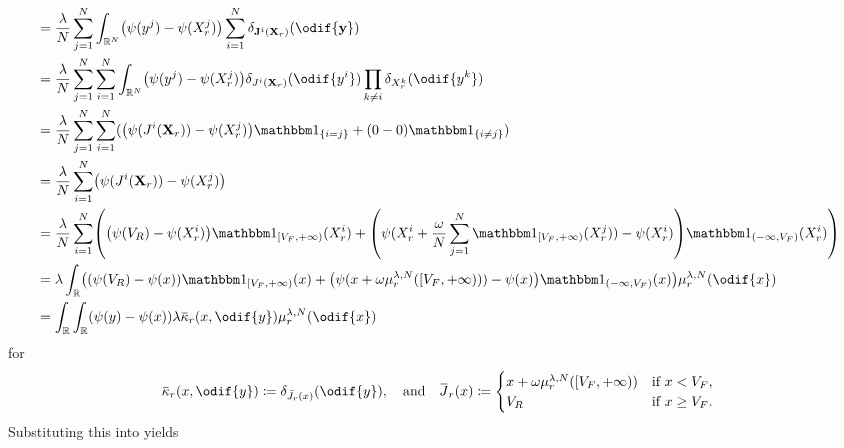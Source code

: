 \begin{equation}
\begin{split}
     & = \frac{\lambda}{N} \sum_{j=1}^N \int_{\potspace^N} \br*{ \psi(y^j) - \psi(X_{r}^j) } \sum_{i=1}^N \delta_{\bm{\jtarg}^i(\bm{X}_r)}(\odif{\bm{y}})                                     \\
     & = \frac{\lambda}{N} \sum_{j=1}^N \sum_{i=1}^N \int_{\potspace^N} \br*{ \psi(y^j) - \psi(X_{r}^j) } \delta_{\jtarg^i(\bm{X}_r)}(\odif{y^i}) \prod_{k \neq i} \delta_{X_r^k}(\odif{y^k}) \\
     & = \frac{\lambda}{N} \sum_{j=1}^N \sum_{i=1}^N \br{ \br*{ \psi(\jtarg^i(\bm{X}_r)) - \psi(X_{r}^j) } \ind{i = j} + (0 - 0) \ind{i \neq j} }                                             \\
     & = \frac{\lambda}{N} \sum_{i=1}^N \br*{ \psi(\jtarg^i(\bm{X}_r)) - \psi(X_{r}^j) }                                                                                                      \\
     & = \frac{\lambda}{N} \sum_{i=1}^N \br*{ \br*{ \psi(V_R) - \psi(X_{r}^i) } \indE{[V_F,+\infty)}(X_{r}^i)
    + \br*{ \psi(X_{r}^i + \frac{\omega}{N} \sum_{j=1}^N \indE{[V_F,+\infty)}(X_{r}^j)) - \psi(X_{r}^i) } \indE{(-\infty,V_F)}(X_{r}^i) }                                                     \\
     & = \lambda \int_\potspace \br*{ \br*{ \psi(V_R) - \psi(x) } \indE{[V_F,+\infty)}(x)
    + \br*{ \psi(x + \omega \mu_r^{\lambda, N}([V_F,+\infty))) - \psi(x) } \indE{(-\infty,V_F)}(x) } \mu_{r}^{\lambda, N}(\odif{x})                                                           \\
     & = \int_\potspace \int_\potspace (\psi(y) - \psi(x)) \lambda \ol{\kappa}_r(x, \odif{y}) \mu_{r}^{\lambda, N}(\odif{x})
  \end{split}
\end{equation}
for
\begin{equation}
  \ol{\kappa}_r(x, \odif{y}) \coloneqq \delta_{\bar{\jtarg}_r(x)}(\odif{y}),
  \quad\text{and}\quad
  \ol{\jtarg}_r(x) \coloneqq \begin{cases}
    x + \omega \mu_r^{\lambda, N}([V_F,+\infty)) & \text{if } x < V_F,    \\
    V_R                                          & \text{if } x \geq V_F.
  \end{cases}
\end{equation}
Substituting this into  yields
